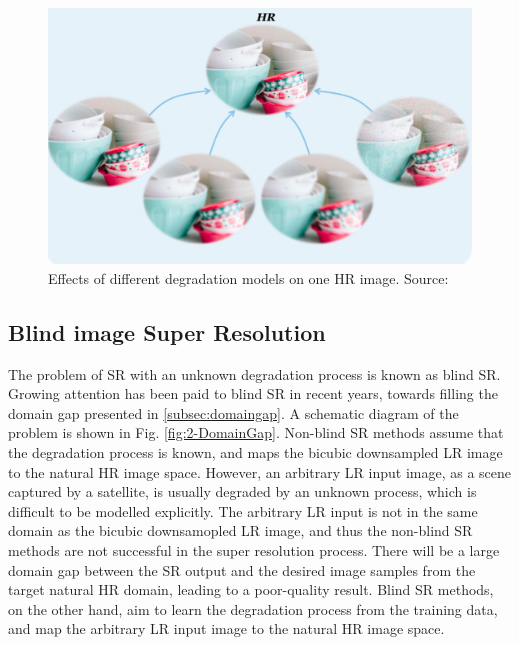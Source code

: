         \begin{figure}[H]
            \centering
            \includegraphics[scale=0.4]{Includes/2-domain-gap.pdf}
            \caption{Effects of different degradation models on one HR image. Source: \cite{liu2021blind}}
            \label{fig:2-domain-gap}
        \end{figure}

    \subsection{Blind image Super Resolution}

        The problem of SR with an unknown degradation process is known as blind SR. 
        Growing attention has been paid to blind SR in recent years, towards filling the domain gap presented in \ref{subsec:domaingap}.
        A schematic diagram of the problem is shown in Fig. \ref{fig:2-DomainGap}. 
        Non-blind SR methods assume that the degradation process is known, and maps the bicubic downsampled LR image to the natural HR image space.
        However, an arbitrary LR input image, as a scene captured by a satellite, is usually degraded by an unknown process, which is difficult to be modelled explicitly.
        The arbitrary LR input is not in the same domain as the bicubic downsamopled LR image, and thus the non-blind SR methods are not successful in the super resolution process.
        There will be a large domain gap between the SR output and the desired image samples from the target natural HR domain, leading to a poor-quality result.
        Blind SR methods, on the other hand, aim to learn the degradation process from the training data, and map the arbitrary LR input image to the natural HR image space.
        
